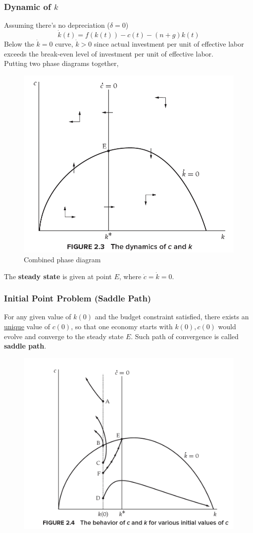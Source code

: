\documentclass[]{article}
\begin{document}
		\subsubsection{Dynamic of $k$}
		\par Assuming there's no depreciation ($\delta=0$)
		\begin{equation}
			\dot{k}(t) = f(k(t)) - c(t) - (n+g)k(t)
		\end{equation}
		Below the $\dot{k} = 0$ curve, $\dot{k} > 0$ since actual investment per unit of effective labor exceeds the break-even level of investment per unit of effective labor.
		\\
		Putting two phase diagrams together,
		\begin{figure}[h]
			\centering
			\caption{Combined phase diagram}
			\includegraphics[width=0.5\linewidth]{figures/6_3}
		\end{figure}
		The \textbf{steady state} is given at point $E$, where $\dot{c} = \dot{k} = 0$.
		
		\newpage
		\subsubsection{Initial Point Problem (Saddle Path)}
		\par For any given value of $k(0)$ and the budget constraint satisfied, there exists an \ul{unique} value of $c(0)$, so that one economy starts with $k(0), c(0)$ would evolve and converge to the steady state $E$. Such path of convergence is called \textbf{saddle path}.
		\begin{figure}[h]
			\centering
			\includegraphics[width=0.5\linewidth]{figures/6_4}
		\end{figure}
\end{document}
